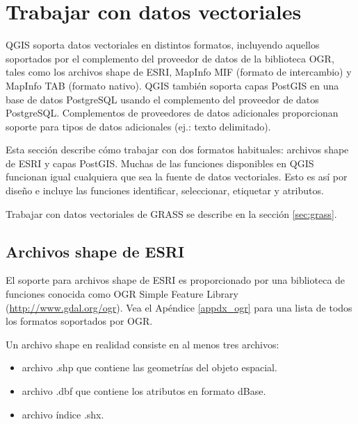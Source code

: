 
\section{Trabajar con datos vectoriales}\label{label_workingvector}

QGIS soporta datos vectoriales en distintos formatos, incluyendo aquellos soportados por el complemento del proveedor de datos de la biblioteca OGR, tales como los archivos shape de ESRI,
MapInfo MIF (formato de intercambio)
y MapInfo TAB (formato nativo).
QGIS también soporta capas PostGIS
en una base de datos PostgreSQL usando el complemento del proveedor de datos PostgreSQL. Complementos de proveedores de datos adicionales proporcionan soporte para tipos de datos adicionales (ej.: texto delimitado).

Esta sección describe cómo trabajar con dos formatos habituales: archivos shape de ESRI y capas PostGIS. Muchas de las funciones disponibles en QGIS funcionan igual cualquiera que sea la fuente de datos vectoriales. Esto es así por diseño e incluye las funciones identificar, seleccionar, etiquetar y atributos.

Trabajar con datos vectoriales de GRASS se describe en la sección \ref{sec:grass}.

\subsection{Archivos shape de ESRI}

El soporte para archivos shape de ESRI es proporcionado por una biblioteca de funciones conocida como OGR Simple Feature Library (\url{http://www.gdal.org/ogr}). Vea el Apéndice \ref{appdx_ogr} para una lista de todos los formatos soportados por OGR.

Un archivo shape en realidad consiste en al menos tres archivos:

\begin{itemize}
\item archivo .shp que contiene las geometrías del objeto espacial.
\item archivo .dbf que contiene los atributos en formato dBase.
\item archivo índice .shx.
\end{itemize}

